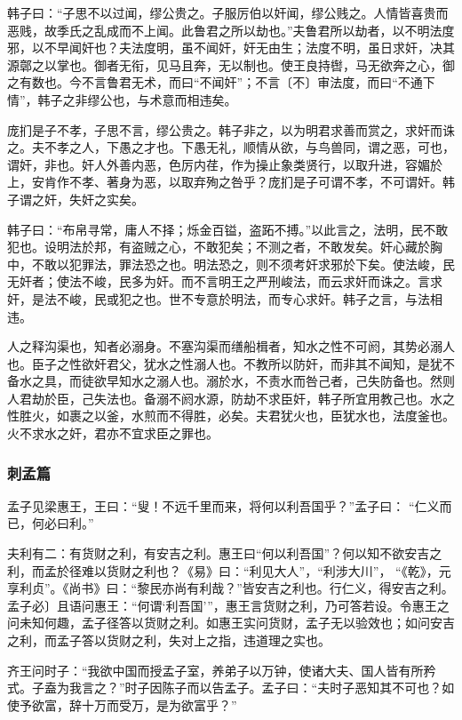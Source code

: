 \documentclass[]{article}
\begin{document}
韩子曰：``子思不以过闻，缪公贵之。子服厉伯以奸闻，缪公贱之。人情皆喜贵而恶贱，故季氏之乱成而不上闻。此鲁君之所以劫也。''夫鲁君所以劫者，以不明法度邪，以不早闻奸也？夫法度明，虽不闻奸，奸无由生；法度不明，虽日求奸，决其源鄣之以掌也。御者无衔，见马且奔，无以制也。使王良持辔，马无欲奔之心，御之有数也。今不言鲁君无术，而曰``不闻奸''；不言〔不〕审法度，而曰``不通下情''，韩子之非缪公也，与术意而相违矣。

庞扪是子不孝，子思不言，缪公贵之。韩子非之，以为明君求善而赏之，求奸而诛之。夫不孝之人，下愚之才也。下愚无礼，顺情从欲，与鸟兽同，谓之恶，可也，谓奸，非也。奸人外善内恶，色厉内荏，作为操止象类贤行，以取升进，容媚於上，安肯作不孝、著身为恶，以取弃殉之咎乎？庞扪是子可谓不孝，不可谓奸。韩子谓之奸，失奸之实矣。

韩子曰：``布帛寻常，庸人不择；烁金百镒，盗跖不搏。''以此言之，法明，民不敢犯也。设明法於邦，有盗贼之心，不敢犯矣；不测之者，不敢发矣。奸心藏於胸中，不敢以犯罪法，罪法恐之也。明法恐之，则不须考奸求邪於下矣。使法峻，民无奸者；使法不峻，民多为奸。而不言明王之严刑峻法，而云求奸而诛之。言求奸，是法不峻，民或犯之也。世不专意於明法，而专心求奸。韩子之言，与法相违。

人之释沟渠也，知者必溺身。不塞沟渠而缮船楫者，知水之性不可阏，其势必溺人也。臣子之性欲奸君父，犹水之性溺人也。不教所以防奸，而非其不闻知，是犹不备水之具，而徒欲早知水之溺人也。溺於水，不责水而咎己者，己失防备也。然则人君劫於臣，己失法也。备溺不阏水源，防劫不求臣奸，韩子所宜用教己也。水之性胜火，如裹之以釜，水煎而不得胜，必矣。夫君犹火也，臣犹水也，法度釜也。火不求水之奸，君亦不宜求臣之罪也。

\hypertarget{header-n447}{%
\subsubsection{刺孟篇}\label{header-n447}}

孟子见梁惠王，王曰：``叟！不远千里而来，将何以利吾国乎？''孟子曰：
``仁义而已，何必曰利。''

夫利有二：有货财之利，有安吉之利。惠王曰``何以利吾国''？何以知不欲安吉之利，而孟於径难以货财之利也？《易》曰：``利见大人''，``利涉大川''，
``《乾》，元享利贞''。《尚书》曰：``黎民亦尚有利哉？''皆安吉之利也。行仁义，得安吉之利。孟子必〕且语问惠王：``何谓`利吾国'''，惠王言货财之利，乃可答若设。令惠王之问未知何趣，孟子径答以货财之利。如惠王实问货财，孟子无以验效也；如问安吉之利，而孟子答以货财之利，失对上之指，违道理之实也。

齐王问时子：``我欲中国而授孟子室，养弟子以万钟，使诸大夫、国人皆有所矜式。子盍为我言之？''时子因陈子而以告孟子。孟子曰：``夫时子恶知其不可也？如使予欲富，辞十万而受万，是为欲富乎？''
\end{document}
